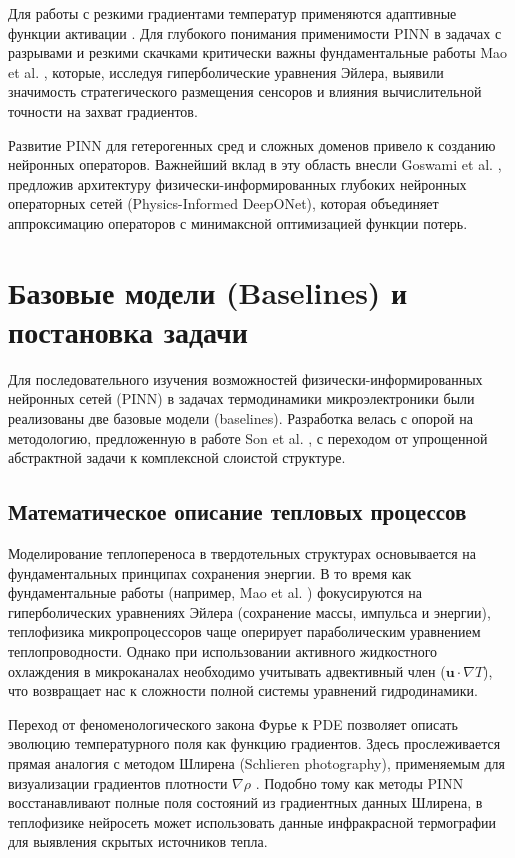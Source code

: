 \documentclass[conference]{IEEEtran}
\begin{document}
    Для работы с резкими градиентами температур применяются адаптивные функции активации \cite{jagtap2020}. Для глубокого понимания применимости PINN в задачах с разрывами и резкими скачками критически важны фундаментальные работы Mao et al. \cite{mao2020}, которые, исследуя гиперболические уравнения Эйлера, выявили значимость стратегического размещения сенсоров и влияния вычислительной точности на захват градиентов.
    
    Развитие PINN для гетерогенных сред и сложных доменов привело к созданию нейронных операторов. Важнейший вклад в эту область внесли Goswami et al. \cite{goswami2022}, предложив архитектуру физически-информированных глубоких нейронных операторных сетей (Physics-Informed DeepONet), которая объединяет аппроксимацию операторов с минимаксной оптимизацией функции потерь.
    
    \section{Базовые модели (Baselines) и постановка задачи}
    
    Для последовательного изучения возможностей физически-информированных нейронных сетей (PINN) в задачах термодинамики микроэлектроники были реализованы две базовые модели (baselines). Разработка велась с опорой на методологию, предложенную в работе Son et al. \cite{son2023}, с переходом от упрощенной абстрактной задачи к комплексной слоистой структуре.
    
    \subsection{Математическое описание тепловых процессов}
    Моделирование теплопереноса в твердотельных структурах основывается на фундаментальных принципах сохранения энергии. В то время как фундаментальные работы (например, Mao et al. \cite{mao2020}) фокусируются на гиперболических уравнениях Эйлера (сохранение массы, импульса и энергии), теплофизика микропроцессоров чаще оперирует параболическим уравнением теплопроводности. Однако при использовании активного жидкостного охлаждения в микроканалах необходимо учитывать адвективный член ($\mathbf{u} \cdot \nabla T$), что возвращает нас к сложности полной системы уравнений гидродинамики.
    
    Переход от феноменологического закона Фурье к PDE позволяет описать эволюцию температурного поля как функцию градиентов. Здесь прослеживается прямая аналогия с методом Шлирена (Schlieren photography), применяемым для визуализации градиентов плотности $\nabla \rho$ \cite{mao2020}. Подобно тому как методы PINN восстанавливают полные поля состояний из градиентных данных Шлирена, в теплофизике нейросеть может использовать данные инфракрасной термографии для выявления скрытых источников тепла.
    
\end{document}
